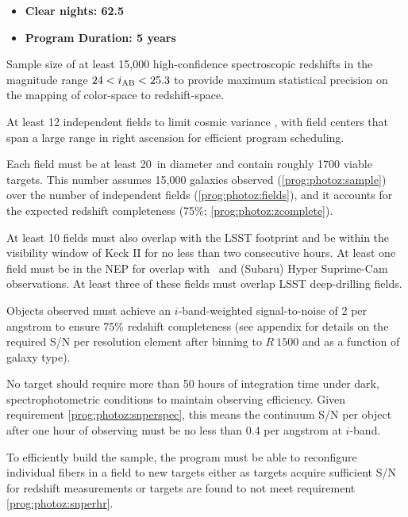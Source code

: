 \documentclass[11pt,a4paper,twoside,onecolumn,openany,final,oldfontcommands]{memoir}
\begin{document}
\medskip
\begin{itemize}[leftmargin=0.3in, itemsep=0pt]
	\item[] \textbf{Clear nights: 62.5}
	\item[] \textbf{Program Duration: 5 years}
\end{itemize}


\begin{programrequirement}
\reqitem Sample size of at least 15,000 high-confidence spectroscopic redshifts in the magnitude range $24 < i_{\rm AB} < 25.3$ to provide maximum statistical precision on the mapping of color-space to redshift-space. \label{prog:photoz:sample}


\reqitem At least 12 independent fields to limit cosmic variance \citep[see][]{newman15}, with field centers that span a large range in right ascension for efficient program scheduling. \label{prog:photoz:fields}

\reqitem Each field must be at least 20\arcmin\ in diameter and contain roughly 1700 viable targets.  This number assumes 15,000 galaxies observed (\ref{prog:photoz:sample}) over the number of independent fields (\ref{prog:photoz:fields}), and it accounts for the expected redshift completeness (75\%; \ref{prog:photoz:zcomplete}).


\reqitem At least 10 fields must also overlap with the LSST footprint and be within the visibility window of Keck II for no less than two consecutive hours.
\reqitem At least one field must be in the NEP for overlap with \euclid\ and (Subaru) Hyper Suprime-Cam observations.
\reqitem At least three of these fields must overlap LSST deep-drilling fields.

\reqitem Objects observed must achieve an $i$-band-weighted signal-to-noise of 2 per angstrom to ensure 75\% redshift completeness (see \citet{masters15} appendix for details on the required S/N per resolution element after binning to $R~1500$ and as a function of galaxy type).  \label{prog:photoz:snperspec}


\reqitem No target should require more than 50 hours of integration time under dark, spectrophotometric conditions to maintain observing efficiency.  Given requirement \ref{prog:photoz:snperspec}, this means the continuum S/N per object after one hour of observing must be no less than 0.4 per angstrom at $i$-band.  \label{prog:photoz:snperhr}

\reqitem To efficiently build the sample, the program must be able to reconfigure individual fibers in a field to new targets either as targets acquire sufficient S/N for redshift measurements or targets are found to not meet requirement \ref{prog:photoz:snperhr}.
\end{programrequirement}
\end{document}
